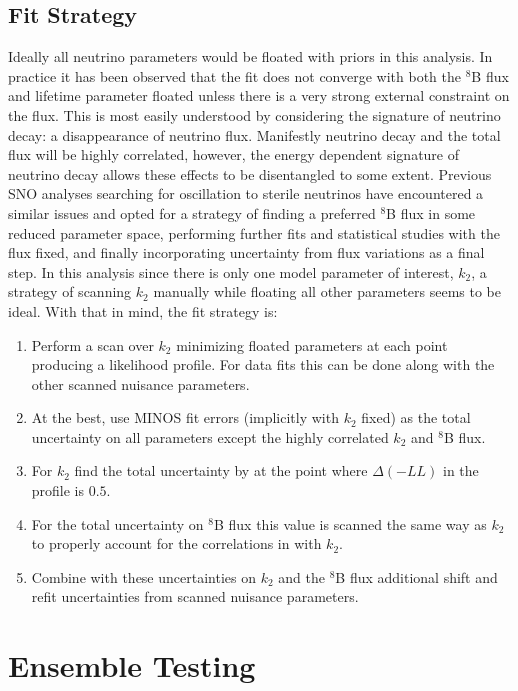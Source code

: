 \subsection{Fit Strategy}
\label{strategy}
Ideally all neutrino parameters would be floated with priors in this analysis. 
In practice it has been observed that the fit does not converge with both the $^8$B flux and lifetime parameter floated unless there is a very strong external constraint on the flux.
This is most easily understood by considering the signature of neutrino decay: a disappearance of neutrino flux.
Manifestly neutrino decay and the total flux will be highly correlated, however, the energy dependent signature of neutrino decay allows these effects to be disentangled to some extent.
Previous SNO analyses searching for oscillation to sterile neutrinos \cite{plthesis} have encountered a similar issues and opted for a strategy of finding a preferred $^8$B flux in some reduced parameter space, performing further fits and statistical studies with the flux fixed, and finally incorporating uncertainty from flux variations as a final step.
In this analysis since there is only one model parameter of interest, $k_2$, a strategy of scanning $k_2$ manually while floating all other parameters seems to be ideal. 
With that in mind, the fit strategy is:
\begin{enumerate}
\item Perform a scan over $k_2$ minimizing floated parameters at each point producing a likelihood profile. For data fits this can be done along with the other scanned nuisance parameters.
\item At the best, use MINOS fit errors (implicitly with $k_2$ fixed) as the total uncertainty on all parameters except the highly correlated $k_2$ and $^8$B flux.
\item For $k_2$ find the total uncertainty by at the point where $\Delta(-LL)$ in the profile is $0.5$.
\item For the total uncertainty on $^8$B flux this value is scanned the same way as $k_2$ to properly account for the correlations in with $k_2$.
\item Combine with these uncertainties on $k_2$ and the $^8$B flux additional shift and refit uncertainties from scanned nuisance parameters.
\end{enumerate}

\section{Ensemble Testing}
\label{ensemble_tests}

